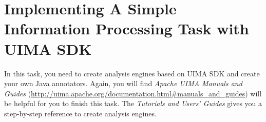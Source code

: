 
\chapter{Implementing A Simple Information Processing Task with UIMA SDK}

In this task, you need to create analysis engines based on UIMA SDK and create
your own Java annotators. Again, you will find \emph{Apache UIMA Manuals and
Guides} (\url{http://uima.apache.org/documentation.html#manuals_and_guides})
will be helpful for you to finish this task. The \emph{Tutorials and Users'
Guides} gives you a step-by-step reference to create analysis engines.






